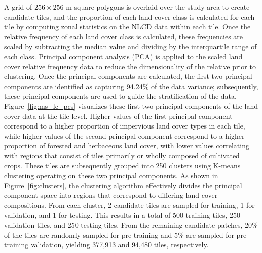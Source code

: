 A grid of \(256 \times 256\) m square polygons is overlaid over the study area to create candidate tiles, and the proportion of each land cover class is calculated for each tile by computing zonal statistics on the NLCD data within each tile.
Once the relative frequency of each land cover class is calculated, these frequencies are scaled by subtracting the median value and dividing by the interquartile range of each class.
Principal component analysis (PCA) is applied to the scaled land cover relative frequency data to reduce the dimensionality of the relative  prior to clustering.
Once the principal components are calculated, the first two principal components are identified as capturing 94.24\% of the data variance; subsequently, these principal components are used to guide the stratification of the data.
Figure~\ref{fig:ms_lc_pcs} visualizes these first two principal components of the land cover data at the tile level.
Higher values of the first principal component correspond to a higher proportion of impervious land cover types in each tile, while higher values of the second principal component correspond to a higher proportion of forested and herbaceous land cover, with lower values correlating with regions that consist of tiles primarily or wholly composed of cultivated crops.
These tiles are subsequently grouped into 250 clusters using K-means clustering operating on these two principal components. 
As shown in Figure~\ref{fig:clusters}, the clustering algorithm effectively divides the principal component space into regions that correspond to differing land cover compositions.
From each cluster, 2 candidate tiles are sampled for training, 1 for validation, and 1 for testing.
This results in a total of 500 training tiles, 250 validation tiles, and 250 testing tiles.
From the remaining candidate patches, 20\% of the tiles are randomly sampled for pre-training and 5\% are sampled for pre-training validation, yielding 377,913 and 94,480 tiles, respectively. 







